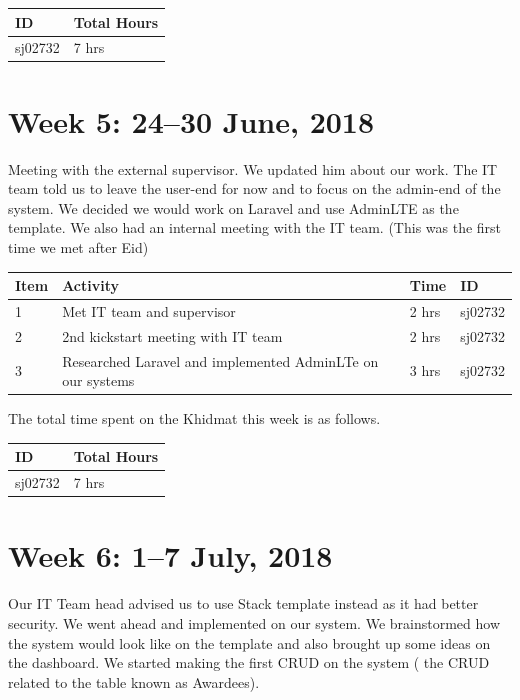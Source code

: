 \documentclass{article}
\begin{document}
\begin{tabular}{|l|l|}
  \hline
  ID & Total Hours\\\hline\hline
  sj02732 & 7 hrs\\\hline
\end{tabular}

\newpage %
\section*{Week 5: 24--30 June, 2018}

Meeting with the external supervisor. We updated him about our work. The IT team told us to leave the user-end for now and to focus on the admin-end of the system. We decided we would work on Laravel and use AdminLTE as the template. We also had an internal meeting with the IT team. (This was the first time we met after Eid) \newline

\begin{tabular}{|l|l|l|l|}
  \hline
  Item 	& Activity & Time & ID \\\hline\hline
  1	& Met IT team and supervisor & 2 hrs & sj02732 \\\hline
  2	& 2nd kickstart meeting with IT team & 2 hrs & sj02732 \\\hline
  3	& Researched Laravel and implemented AdminLTe on our systems & 3 hrs & sj02732 \\\hline
\end{tabular}
\newline
The total time spent on the Khidmat this week is as follows.

\begin{tabular}{|l|l|}
  \hline
  ID & Total Hours\\\hline\hline
  sj02732 & 7 hrs\\\hline
\end{tabular}

\newpage %
\section*{Week 6: 1--7 July, 2018}

Our IT Team head advised us to use Stack template instead as it had better security. We went ahead and implemented on our system. We brainstormed how the system would look like on the template and also brought up some ideas on the dashboard. We started making the first CRUD on the system ( the CRUD related to the table known as Awardees). \newline
\end{document}
